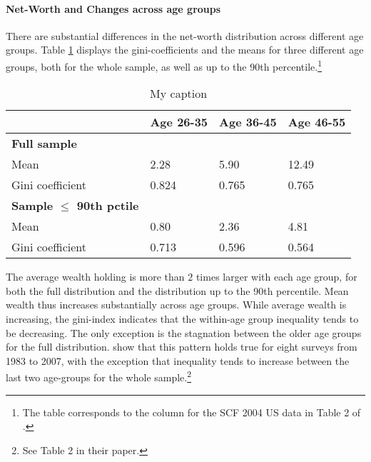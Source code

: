 \documentclass[12pt,a4paper,leqno]{article}
\theoremstyle{definition}
\begin{document}
\paragraph{Net-Worth and Changes across age groups}
There are substantial differences in the net-worth distribution across different age groups. Table \ref{facts_changes} displays the gini-coefficients and the means for three different age groups, both for the whole sample, as well as up to the 90th percentile.\footnote{The table corresponds to the column for the SCF 2004 US data in Table 2 of \cite{hintermaier2011}. } \\

\begin{table}[!htbp]
\centering
\caption{My caption}
\label{facts_changes}
\begin{tabular}{@{}llll@{}}
\toprule
                     & Age 26-35 & Age 36-45 & Age 46-55 \\ \midrule
\textbf{Full sample}          &           &           &           \\
Mean                 & 2.28      & 5.90      & 12.49     \\
Gini coefficient     & 0.824     & 0.765     & 0.765     \\
\textbf{Sample $\leq$ 90th pctile} &           &           &           \\
Mean                 & 0.80      & 2.36      & 4.81      \\
Gini coefficient     & 0.713     & 0.596     & 0.564     \\ \bottomrule
\end{tabular}
\end{table}

The average wealth holding is more than $2$ times larger with each age group, for both the full distribution and the distribution up to the 90th percentile. Mean wealth thus increases substantially across age groups. While average wealth is increasing, the gini-index indicates that the within-age group inequality tends to be decreasing. The only exception is the stagnation between the older age groups for the full distribution. \cite{hintermaier2011} show that this pattern holds true for eight surveys from 1983 to 2007, with the exception that inequality tends to  increase between the last two age-groups for the whole sample.\footnote{See Table 2 in their paper.} \\
\end{document}
